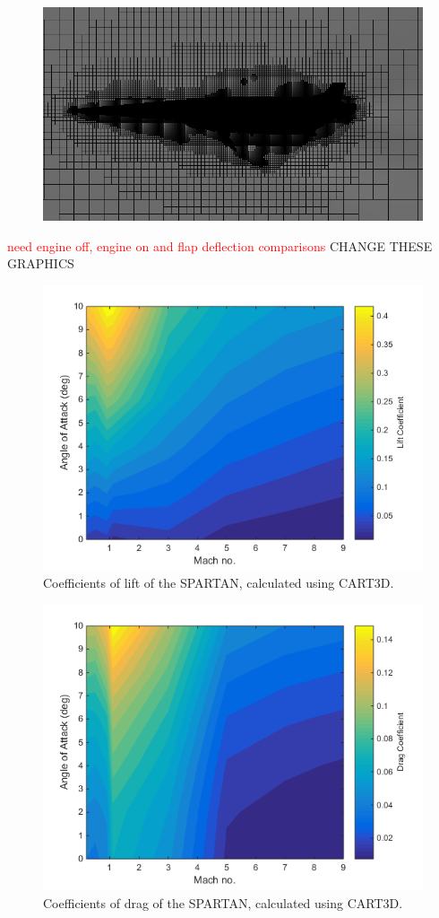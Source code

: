 \begin{figure}
\centering
\includegraphics[width=0.7\linewidth]{figures/3_vehicle_design/M3AoA6GRID}
\caption{}
\label{fig:M3AoA6GRID}
\end{figure}

\textcolor{red}{need engine off, engine on and flap deflection comparisons}
CHANGE THESE GRAPHICS
\begin{figure}
\centering
\includegraphics[width=0.7\linewidth]{figures/3_vehicle_design/Cl}
\caption{Coefficients of lift of the SPARTAN, calculated using CART3D.}
\label{fig:Cl}
\end{figure}
\begin{figure}
\centering
\includegraphics[width=0.7\linewidth]{figures/3_vehicle_design/Cd}
\caption{Coefficients of drag of the SPARTAN, calculated using CART3D.}
\label{fig:Cd}
\end{figure}
